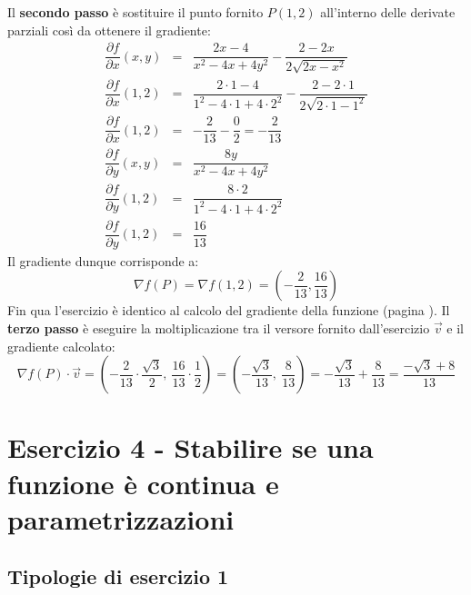 \documentclass[a4paper]{article}
\begin{document}
	\noindent
	Il \textbf{secondo passo} è sostituire il punto fornito $P\left(1,2\right)$ all'interno delle derivate parziali così da ottenere il gradiente:
	\begin{equation*}
		\begin{array}{rcl}
			\dfrac{\partial f}{\partial x}\left(x,y\right) &=& \dfrac{2x - 4}{x^{2}-4x+4y^{2}} - \dfrac{2-2x}{2\sqrt{2x-x^{2}}} \\ [1.5em]
			\dfrac{\partial f}{\partial x}\left(1,2\right) &=& \dfrac{2 \cdot 1 - 4}{1^{2}-4 \cdot 1+4 \cdot 2^{2}} - \dfrac{2-2 \cdot 1}{2\sqrt{2 \cdot 1- 1^{2}}} \\ [1.5em]
			\dfrac{\partial f}{\partial x}\left(1,2\right) &=& -\dfrac{2}{13} - \dfrac{0}{2} = -\dfrac{2}{13} \\ [2.5em]
			\dfrac{\partial f}{\partial y}\left(x,y\right) &=& \dfrac{8y}{x^{2} - 4x + 4y^{2}} \\ [1.5em]
			\dfrac{\partial f}{\partial y}\left(1,2\right) &=& \dfrac{8 \cdot 2}{1^{2} - 4 \cdot 1 + 4 \cdot 2^{2}} \\ [1.5em]
			\dfrac{\partial f}{\partial y}\left(1,2\right) &=& \dfrac{16}{13}
		\end{array}
	\end{equation*}
	Il gradiente dunque corrisponde a:
	\begin{equation*}
		\nabla f\left(P\right) = \nabla f\left(1,2\right) = \left(-\dfrac{2}{13}, \dfrac{16}{13}\right)
	\end{equation*}
	Fin qua l'esercizio è identico al calcolo del gradiente della funzione (pagina \pageref{par: calcolare il gradiente della funzione}). Il \textbf{terzo passo} è eseguire la moltiplicazione tra il versore fornito dall'esercizio $\overrightarrow{v}$ e il gradiente calcolato:
	\begin{equation*}
		\nabla f\left(P\right) \cdot \overrightarrow{v} = \left(-\dfrac{2}{13} \cdot \dfrac{\sqrt{3}}{2}, \: \dfrac{16}{13} \cdot \dfrac{1}{2}\right) = \left(-\dfrac{\sqrt{3}}{13}, \: \dfrac{8}{13}\right) = -\dfrac{\sqrt{3}}{13} + \dfrac{8}{13} = \dfrac{-\sqrt{3} + 8}{13}
	\end{equation*}\newpage

	\section{Esercizio 4 - Stabilire se una funzione è continua e parametrizzazioni}

	\subsection{Tipologie di esercizio 1}
\end{document}
